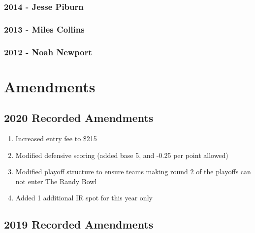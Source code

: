 \documentclass[
]{book}
\providecommand{\tightlist}{%
  \setlength{\itemsep}{0pt}\setlength{\parskip}{0pt}}
\begin{document}
\hypertarget{jesse-piburn-2}{%
\subsection*{\texorpdfstring{\textbf{2014} - Jesse Piburn}{2014 - Jesse Piburn}}\label{jesse-piburn-2}}

\hypertarget{miles-collins-2}{%
\subsection*{\texorpdfstring{\textbf{2013} - Miles Collins}{2013 - Miles Collins}}\label{miles-collins-2}}

\hypertarget{noah-newport-1}{%
\subsection*{\texorpdfstring{\textbf{2012} - Noah Newport}{2012 - Noah Newport}}\label{noah-newport-1}}

\hypertarget{amendments}{%
\chapter{Amendments}\label{amendments}}

\hypertarget{recorded-amendments}{%
\section{2020 Recorded Amendments}\label{recorded-amendments}}

\begin{enumerate}
\def\labelenumi{\arabic{enumi}.}
\tightlist
\item
  Increased entry fee to \$215
\item
  Modified defensive scoring (added base 5, and -0.25 per point allowed)
\item
  Modified playoff structure to ensure teams making round 2 of the playoffs can not enter The Randy Bowl
\item
  Added 1 additional IR spot for this year only
\end{enumerate}

\hypertarget{recorded-amendments-1}{%
\section{2019 Recorded Amendments}\label{recorded-amendments-1}}
\end{document}
